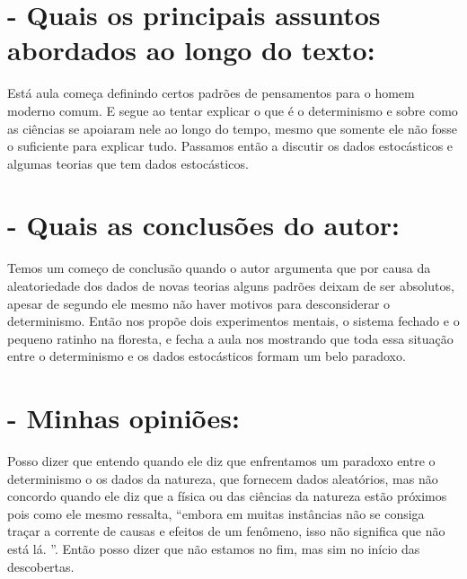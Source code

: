 \documentclass [a4paper, 12pt]{article}
\begin{document}
\section*{- Quais os principais assuntos abordados ao longo do texto:}

Está aula começa definindo certos padrões de pensamentos para o homem moderno comum. E segue ao tentar explicar o que é o determinismo e sobre como as ciências se apoiaram nele ao longo do tempo, mesmo que somente ele não fosse o suficiente para explicar tudo. Passamos então a discutir os dados estocásticos e algumas teorias que tem dados estocásticos.

\section*{- Quais as conclusões do autor:}

Temos um começo de conclusão quando o autor argumenta que por causa da aleatoriedade dos dados de novas teorias alguns padrões deixam de ser absolutos, apesar de segundo ele mesmo não haver motivos para desconsiderar o determinismo. Então nos propõe dois experimentos mentais, o sistema fechado e o pequeno ratinho na floresta, e fecha a aula nos mostrando que toda essa situação entre o determinismo e os dados estocásticos formam um belo paradoxo. 

\section*{- Minhas opiniões:}

Posso dizer que entendo quando ele diz que enfrentamos um paradoxo entre o determinismo o os dados da natureza, que fornecem dados aleatórios, mas não concordo quando ele diz que a física ou das ciências da natureza estão próximos pois como ele mesmo ressalta, “embora em muitas instâncias não se consiga traçar a corrente de causas e efeitos de um fenômeno, isso não significa que não está lá. ”. Então posso dizer que não estamos no fim, mas sim no início das descobertas. 
\end{document}
